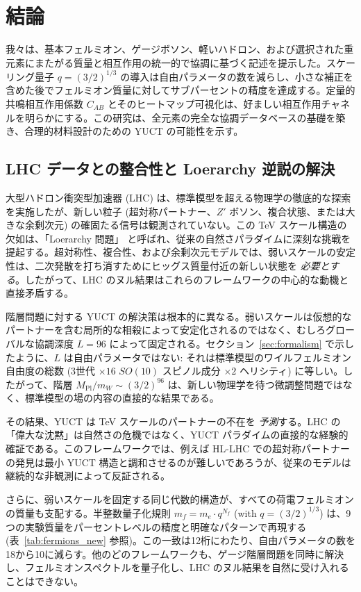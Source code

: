 \documentclass[11pt,a4paper]{article}
\theoremstyle{remark}
\begin{document}
	\section{結論}
	\label{sec:conclusion}
	
	我々は、基本フェルミオン、ゲージボソン、軽いハドロン、および選択された重元素にまたがる質量と相互作用の統一的で協調に基づく記述を提示した。スケーリング量子 \(q = (3/2)^{1/3}\) の導入は自由パラメータの数を減らし、小さな補正を含めた後でフェルミオン質量に対してサブパーセントの精度を達成する。定量的共鳴相互作用係数 \(C_{AB}\) とそのヒートマップ可視化は、好ましい相互作用チャネルを明らかにする。この研究は、全元素の完全な協調データベースの基礎を築き、合理的材料設計のための YUCT の可能性を示す。
	
	\subsection{LHC データとの整合性と Loerarchy 逆説の解決}
	
	大型ハドロン衝突型加速器 (LHC) は、標準模型を超える物理学の徹底的な探索を実施したが、新しい粒子 (超対称パートナー、$Z'$ ボソン、複合状態、または大きな余剰次元) の確固たる信号は観測されていない。この TeV スケール構造の欠如は、「Loerarchy 問題」\cite{Koren2020} と呼ばれ、従来の自然さパラダイムに深刻な挑戦を提起する。超対称性、複合性、および余剰次元モデルでは、弱いスケールの安定性は、二次発散を打ち消すためにヒッグス質量付近の新しい状態を \emph{必要とする}。したがって、LHC のヌル結果はこれらのフレームワークの中心的な動機と直接矛盾する。
	
	階層問題に対する YUCT の解決策は根本的に異なる。弱いスケールは仮想的なパートナーを含む局所的な相殺によって安定化されるのではなく、むしろグローバルな協調深度 $L=96$ によって固定される。セクション~\ref{sec:formalism} で示したように、$L$ は自由パラメータではない: それは標準模型のワイルフェルミオン自由度の総数 (3世代 $\times 16$ $SO(10)$ スピノル成分 $\times 2$ ヘリシティ) に等しい。したがって、階層 $M_{\mathrm{Pl}}/m_W \sim (3/2)^{96}$ は、新しい物理学を待つ微調整問題ではなく、標準模型の場の内容の直接的な結果である。
	
	その結果、YUCT は TeV スケールのパートナーの不在を \emph{予測}する。LHC の「偉大な沈黙」は自然さの危機ではなく、YUCT パラダイムの直接的な経験的確証である。このフレームワークでは、例えば HL-LHC での超対称パートナーの発見は最小 YUCT 構造と調和させるのが難しいであろうが、従来のモデルは継続的な非観測によって反証される。
	
	さらに、弱いスケールを固定する同じ代数的構造が、すべての荷電フェルミオンの質量も支配する。半整数量子化規則 $m_f = m_e \cdot q^{N_f}$ (with $q = (3/2)^{1/3}$) は、9つの実験質量をパーセントレベルの精度と明確なパターンで再現する (表~\ref{tab:fermions_new} 参照)。この一致は12桁にわたり、自由パラメータの数を18から10に減らす。他のどのフレームワークも、ゲージ階層問題を同時に解決し、フェルミオンスペクトルを量子化し、LHC のヌル結果を自然に受け入れることはできない。
	
\end{document}
